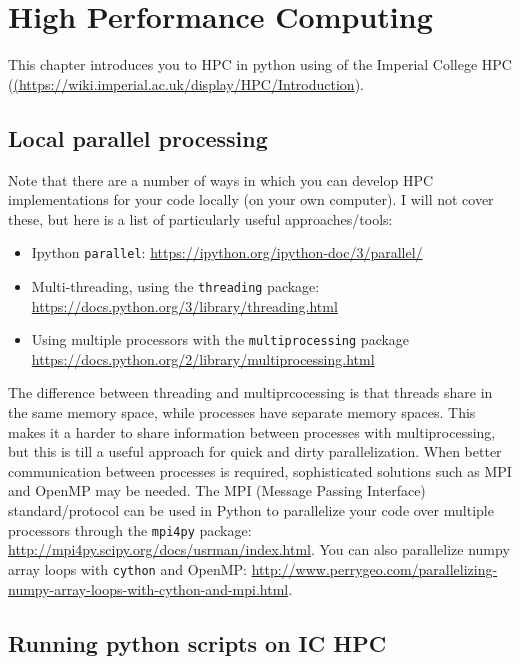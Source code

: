 \chapter{High Performance Computing}
\label{chap:HPC}

This chapter introduces you to HPC in python using of the Imperial College HPC (\url{(https://wiki.imperial.ac.uk/display/HPC/Introduction}). 

\section{Local parallel processing}

Note that there are a number of ways in which you can develop HPC implementations for your code locally (on your own computer). I will not cover these, but here is a list of particularly useful approaches/tools:

\begin{itemize}
   \item Ipython {\tt parallel}: \url{https://ipython.org/ipython-doc/3/parallel/}
  \item Multi-threading, using the {\tt threading} package: \url{https://docs.python.org/3/library/threading.html}
  \item Using multiple processors with the {\tt multiprocessing} package    \url{https://docs.python.org/2/library/multiprocessing.html} 
\end{itemize}

The difference between threading and multiprcocessing is that threads share in the same memory space, while processes have separate memory spaces. This makes it a harder to share information between processes with multiprocessing, but this is till a useful approach for quick and dirty parallelization. When better communication between processes is required, sophisticated solutions such as MPI and OpenMP may be needed. The MPI (Message Passing Interface) standard/protocol can be used in Python to parallelize your code over multiple processors through the {\tt mpi4py} package: \url{http://mpi4py.scipy.org/docs/usrman/index.html}. You can also parallelize numpy array loops with {\tt cython} and OpenMP: \url{http://www.perrygeo.com/parallelizing-numpy-array-loops-with-cython-and-mpi.html}.

\section{Running python scripts on IC HPC}

